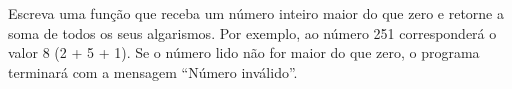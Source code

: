 
\question[10]

Escreva uma função que receba um número inteiro maior do que zero e retorne a soma de todos os seus algarismos. Por exemplo, ao número 251 corresponderá o valor 8 (2 + 5 + 1). Se o número lido não for maior do que zero, o programa terminará com a mensagem ``Número inválido''.